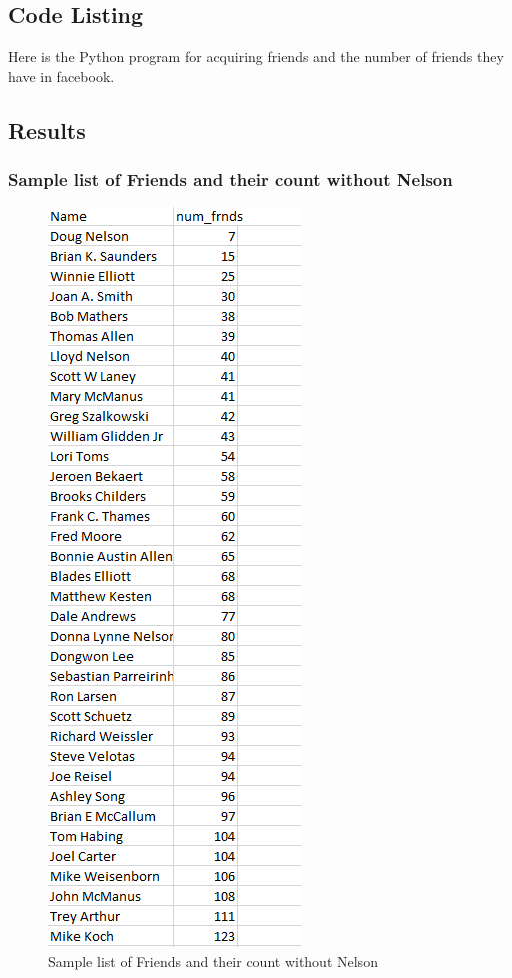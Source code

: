 \subsection{Code Listing}
Here is the Python program for acquiring friends and the number of friends they have in facebook. 



\newpage
\subsection{Results}

\subsubsection{Sample list of Friends and their count without Nelson}
\begin{figure}[ht]    
    \begin{center}
        \includegraphics[scale=0.9]{frnds_without_source_fb.png}
        \caption{Sample list of Friends and their count without Nelson}
        \label{Sample_list1}
    \end{center}
\end{figure}
\newpage
